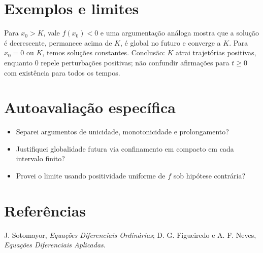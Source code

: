 \documentclass[11pt,a4paper]{article}
\begin{document}
\section{Exemplos e limites}
Para $x_0>K$, vale $f(x_0)<0$ e uma argumentação análoga mostra que a solução é decrescente, permanece acima de $K$, é global no futuro e converge a $K$. Para $x_0=0$ ou $K$, temos soluções constantes. Conclusão: $K$ atrai trajetórias positivas, enquanto $0$ repele perturbações positivas; não confundir afirmações para $t\ge0$ com existência para todos os tempos.
\section{Autoavaliação específica}
\begin{itemize}
\item Separei argumentos de unicidade, monotonicidade e prolongamento?
\item Justifiquei globalidade futura via confinamento em compacto em cada intervalo finito?
\item Provei o limite usando positividade uniforme de $f$ sob hipótese contrária?
\end{itemize}
\RubricaUFMT
\section{Referências}
J. Sotomayor, \emph{Equações Diferenciais Ordinárias}; D. G. Figueiredo e A. F. Neves, \emph{Equações Diferenciais Aplicadas}.
\end{document}
